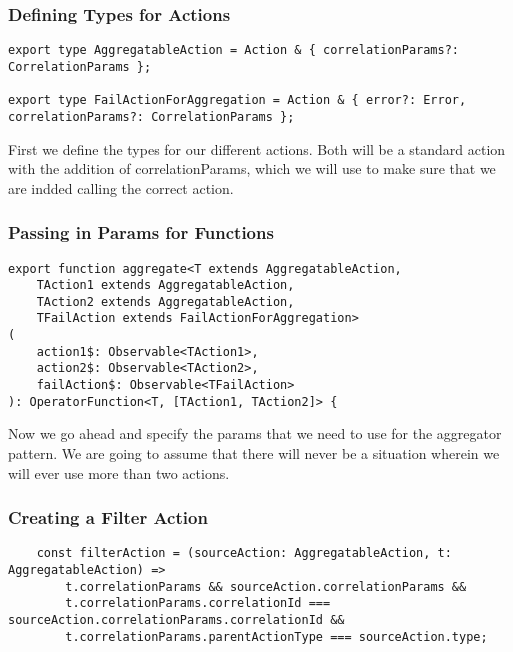 
\subsubsection{Defining Types for Actions}
\begin{lstlisting}
export type AggregatableAction = Action & { correlationParams?: CorrelationParams };

export type FailActionForAggregation = Action & { error?: Error, correlationParams?: CorrelationParams };
\end{lstlisting}

First we define the types for our different actions. Both will be a standard
action with the addition of correlationParams, which we will use to make sure
that we are indded calling the correct action.

\subsubsection{Passing in Params for Functions}
\begin{lstlisting}
export function aggregate<T extends AggregatableAction,
    TAction1 extends AggregatableAction,
    TAction2 extends AggregatableAction,
    TFailAction extends FailActionForAggregation>
(
    action1$: Observable<TAction1>,
    action2$: Observable<TAction2>,
    failAction$: Observable<TFailAction>
): OperatorFunction<T, [TAction1, TAction2]> {
\end{lstlisting}
Now we go ahead and specify the params that we need to use for the aggregator
pattern. We are going to assume that there will never be a situation wherein
we will ever use more than two actions.

\subsubsection{ Creating a Filter Action }
\begin{lstlisting}
    const filterAction = (sourceAction: AggregatableAction, t: AggregatableAction) =>
        t.correlationParams && sourceAction.correlationParams &&
        t.correlationParams.correlationId === sourceAction.correlationParams.correlationId &&
        t.correlationParams.parentActionType === sourceAction.type;
\end{lstlisting}


